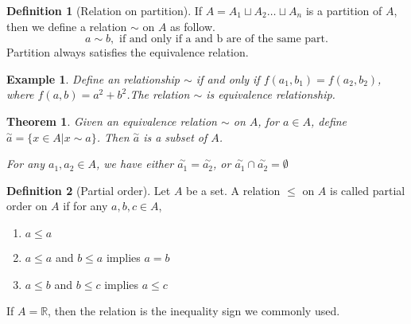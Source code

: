 \documentclass{article}
\theoremstyle{MyNonumberplain}
\theoremstyle{break}
\newcommand{\R}{\mathbb{R}}
\theoremstyle{break}
\newtheorem{theorem}{Theorem}[section]
\newtheorem{example}{Example}[section]
\theoremstyle{break}
\theoremstyle{definition}
\theoremstyle{break}
\newtheorem{definition}{Definition}[section]
\begin{document}
\begin{defbox}
    \begin{definition}[Relation on partition]
        If $A = A_1 \sqcup A_2 \ldots \sqcup A_n$ is a partition of $A$, then we define a
        relation $\sim$ on $A$ as follow.
        \[ a \sim b, \text{ if and only if a and b are of the same part.} \]
        Partition always satisfies the equivalence relation.
    \end{definition}
\end{defbox}

\begin{expbox}
    \begin{example}
        Define an relationship $\sim$ if and only if $f (a_1, b_1) = f (a_2, b_2)$, where $f (a, b) = a^2 + b^2$.\bigskip The relation $\sim$ is equivalence relationship.
    \end{example}
\end{expbox}

\begin{thmbox}
    \begin{theorem}
        Given an equivalence relation $\sim$ on $A$, for $a \in A$, define
        $\overset{\sim}{a} \overset{}{} = \{ x \in A|x \sim a \}$. Then
        $\overset{\sim}{a}$ is a subset of $A$.\bigskip

        For any $a_1, a_2 \in A$, we have either $\overset{\sim}{a_1} = \overset{\sim}{a_2}$,
        or $\overset{\sim}{a_1} \cap \overset{\sim}{a_2} = \emptyset$
    \end{theorem}
\end{thmbox}

\begin{defbox}
    \begin{definition}[Partial order]
        Let $A$ be a set. A relation $\leq$ on $A$ is called partial order on $A$ if for any $a,b,c\in A$,\bigskip
        \begin{enumerate}
            \item $a \leq a$\bigskip
            \item $a \leq a$ and $b \leq a$ implies $a=b$\bigskip
            \item $a \leq b$ and $b \leq c$ implies $a \leq c$
        \end{enumerate}
    \end{definition}
\end{defbox}

If $A=\R$, then the relation is the inequality sign we commonly used.
\end{document}
